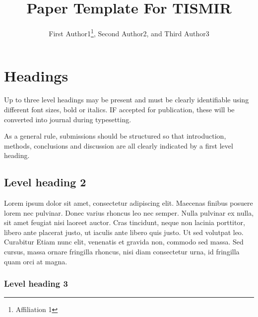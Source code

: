 \documentclass{article}
\title{Paper Template For TISMIR}
\author{First Author1\thanks{Affiliation 1}, Second Author2, and Third Author3}
\begin{document}

\section{Headings}\label{sec:headings}

Up to three level headings may be present and must be clearly identifiable
using different font sizes, bold or italics. IF accepted for publication,
these will be converted into journal during typesetting.

As a general rule, submissions should be structured so that introduction,
methods, conclusions and discussion are all clearly indicated by a first level heading.

\subsection{Level heading 2}

Lorem ipsum dolor sit amet, consectetur adipiscing elit.
Maecenas finibus posuere lorem nec pulvinar. Donec varius
rhoncus leo nec semper. Nulla pulvinar ex nulla, sit amet feugiat
nisi laoreet auctor. Cras tincidunt, neque non lacinia porttitor,
libero ante placerat justo, ut iaculis ante libero quis justo.
Ut sed volutpat leo. Curabitur
Etiam nunc elit, venenatis et gravida non, commodo sed massa.
Sed cursus, massa ornare fringilla rhoncus, nisi diam consectetur urna,
id fringilla quam orci at magna.

\subsubsection{Level heading 3}
\end{document}

